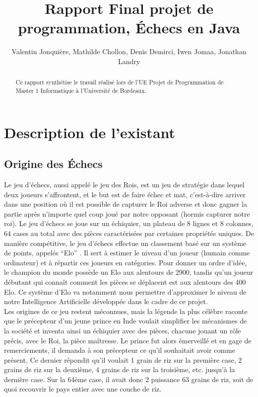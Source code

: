 \documentclass{article}
\author{
    Valentin Jonquière,
    Mathilde Chollon,
    Denis Demirci,
    Iwen Jomaa,
    Jonathan Landry
}
\title{Rapport Final projet de programmation, Échecs en Java}
\begin{document}
\maketitle

\pagebreak

\tableofcontents

\pagebreak
\begin{abstract}
    Ce rapport synthétise le travail réalisé lors de l'UE Projet de Programmation de Master 1 Informatique à l'Université de Bordeaux.
 \end{abstract}

\section{Description de l'existant}
\subsection{Origine des Échecs}
Le jeu d’échecs, aussi appelé le jeu des Rois, est un jeu de stratégie dans lequel deux joueurs s’affrontent,
et le but est de faire échec et mat, c’est-à-dire arriver dans une position où il est possible de capturer
le Roi adverse et donc gagner la partie après n’importe quel coup joué par notre opposant (hormis capturer notre roi).
Le jeu d’échecs se joue sur un échiquier, un plateau de 8 lignes et 8 colonnes, 64 cases au total avec des pièces
caractérisées par certaines propriétés uniques. De manière compétitive, le jeu d'échecs effectue un classement
basé sur un système de points, appelés ``Elo'' \cite{elo}. Il sert à estimer le niveau d'un joueur (humain comme ordinateur) et
à répartir ces joueurs en catégories. Pour donner un ordre d'idée, le champion du monde possède un Elo aux alentours de 2900,
tandis qu'un joueur débutant qui connaît comment les pièces se déplacent est aux alentours des 400 Elo. Ce système d'Elo
va notamment nous permettre d'approximer le niveau de notre Intelligence Artificielle développée dans le cadre de ce projet.\\
Les origines de ce jeu restent méconnues, mais la légende la plus célèbre raconte que le précepteur d’un jeune prince en Inde
voulait simplifier les mécanismes de la société et inventa ainsi un échiquier avec des pièces, chacune jouant un rôle précis,
avec le Roi, la pièce maîtresse. Le prince fut alors émerveillé et en gage de remerciements, il demanda à son précepteur ce
qu’il souhaitait avoir comme présent. Ce dernier répondit qu’il voulait 1 grain de riz sur la première case, 2 grains de riz
sur la deuxième, 4 grains de riz sur la troisième, etc. jusqu’à la dernière case. Sur la 64ème case, il avait donc
2 puissance 63 grains de riz, soit de quoi recouvrir le pays entier avec une couche de riz.
\end{document}
